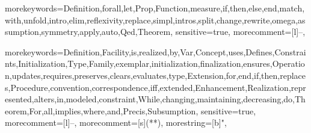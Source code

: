 \usepackage{listings}
\usepackage{amsthm}
\usepackage{amsfonts}
\usepackage{amssymb}
\usepackage{amsmath}
\usepackage{caption}
\usepackage{subcaption}
\usepackage{mathrsfs}

\setcounter{secnumdepth}{3}

\newtheorem{thm}{Theorem}


	{
		morekeywords={Definition,forall,let,Prop,Function,measure,if,then,else,end,match,with,unfold,intro,elim,reflexivity,replace,simpl,intros,split,change,rewrite,omega,assumption,symmetry,apply,auto,Qed,Theorem},
		sensitive=true,
		morecomment=[l]{--},
	}

	{
		morekeywords={Definition,Facility,is,realized,by,Var,Concept,uses,Defines,Constraints,Initialization,Type,Family,exemplar,initialization,finalization,ensures,Operation,updates,requires,preserves,clears,evaluates,type,Extension,for,end,if,then,replaces,Procedure,convention,correspondence,iff,extended,Enhancement,Realization,represented,alters,in,modeled,constraint,While,changing,maintaining,decreasing,do,Theorem,For,all,implies,where,and,Precis,Subsumption},
		sensitive=true,
		morecomment=[l]{--},
		morecomment=[s]{(*}{*)},
		morestring=[b]",
	}
\lstset{language=resolve}

\usepackage{graphicx}

\newcommand{\cplusplus}{{\rm C\raise.5ex\hbox{\small ++}}}
